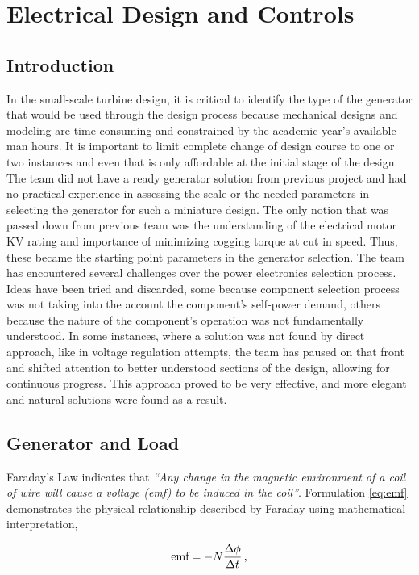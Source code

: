 \documentclass[../ewet_cwc_report.tex]{subfiles}
\begin{document}
\section{Electrical Design and Controls}
\subsection{Introduction}

\noindent
In the small-scale turbine design, it is critical to identify
the type of the generator that would be used through the
design process because mechanical designs and modeling are
time consuming and constrained by the academic year's available
man hours. It is important to limit complete change of design
course to one or two instances and even that is only affordable
at the initial stage of the design. The team did not have a
ready generator solution from previous project and had no
practical experience in assessing the scale or the needed
parameters in selecting the generator for such a miniature
design. The only notion that was passed down from previous
team was the understanding of the electrical motor KV rating
and importance of minimizing cogging torque at cut in speed.
Thus, these became the starting point parameters in the
generator selection. The team has encountered several
challenges over the power electronics selection process.
Ideas have been tried and discarded, some because component
selection process was not taking into the account the
component's self-power demand, others because the nature of the
component's operation was not fundamentally understood. In some
instances, where a solution was not found by direct approach,
like in voltage regulation attempts, the team has paused on that
front and shifted attention to better understood sections of the
design, allowing for continuous progress. This approach proved
to be very effective, and more elegant and natural solutions
were found as a result.

\subsection{Generator and Load}

\noindent
Faraday's Law indicates that \emph{``Any change in the magnetic
  environment of a coil of wire will cause a voltage (emf) to be
  induced in the coil''}. Formulation \eqref{eq:emf} demonstrates
the physical relationship described by Faraday using
mathematical interpretation,

\begin{equation}
  \text{emf} = -N \frac{\Delta \phi}{\Delta t}
  \text{\,,}
  \label{eq:emf}
\end{equation}
\end{document}
